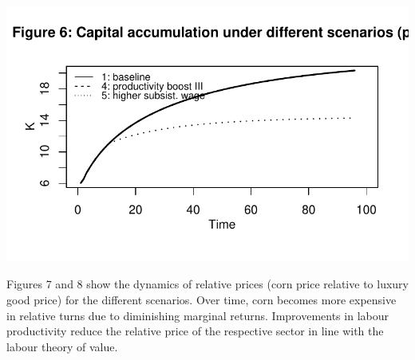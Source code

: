 \documentclass[
  letterpaper,
  DIV=11,
  numbers=noendperiod]{scrreprt}
\begin{document}
\includegraphics{a_ricardian_two_sector_model_files/figure-pdf/ricardo2_3-2.pdf}

Figures 7 and 8 show the dynamics of relative prices (corn price
relative to luxury good price) for the different scenarios. Over time,
corn becomes more expensive in relative turns due to diminishing
marginal returns. Improvements in labour productivity reduce the
relative price of the respective sector in line with the labour theory
of value.
\end{document}

